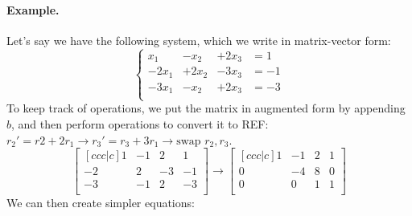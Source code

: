 \documentclass[10pt]{extarticle}
\begin{document}
\begin{multicols*}{2}
\paragraph{Example.} Let's say we have the following system, which we write in matrix-vector form:
\begin{equation*}
	\left\{\begin{aligned}
		x_1 &- x_2 &+ 2x_3 &= 1 \\
		-2x_1 &+ 2x_2 &- 3x_3 &= -1 \\
		-3x_1 &- x_2 &+ 2x_3 &= -3 \\
	\end{aligned}\right.
\end{equation*}
To keep track of operations, we put the matrix in augmented form by appending $b$, and then perform operations to convert it to REF: $r_2' = r2 + 2r_1 \rightarrow r_3' = r_3 + 3r_1 \rightarrow \text{swap } r_2, r_3$.
\begin{equation*}
	\begin{bmatrix}[ccc|c]
		1 & -1 & 2 & 1 \\
		-2 & 2 & -3 & -1 \\
		-3 & -1 & 2 & -3 \\
	\end{bmatrix}
	\rightarrow
	\begin{bmatrix}[ccc|c]
		1 & -1 & 2 & 1 \\
		0 & -4 & 8 & 0 \\
		0 & 0 & 1 & 1 \\
	\end{bmatrix}
\end{equation*}
We can then create simpler equations:
\begin{equation*}

\end{equation*}
\end{multicols*}
\end{document}
